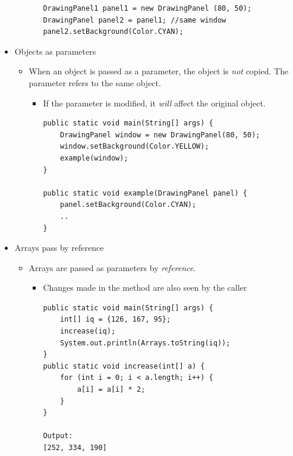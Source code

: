 \documentclass[a4paper]{article}
\begin{document}
\begin{itemize}
\begin{itemize}
\begin{itemize}
\begin{lstlisting}
DrawingPanel1 panel1 = new DrawingPanel (80, 50);
DrawingPanel panel2 = panel1; //same window
panel2.setBackground(Color.CYAN);
					\end{lstlisting}
			\end{itemize}
	\end{itemize}
	\item Objects as parameters
		\begin{itemize}
			\item When an object is passed as a parameter, the object is \textit{not} copied. The parameter refers to the same object.
				\begin{itemize}
					\item If the parameter is modified, it \textit{will} affect the original object.
					\begin{lstlisting}
public static void main(String[] args) {
	DrawingPanel window = new DrawingPanel(80, 50);
	window.setBackground(Color.YELLOW);
	example(window);
}

public static void example(DrawingPanel panel) {
	panel.setBackground(Color.CYAN);
	..
}
					\end{lstlisting}
				\end{itemize}
		\end{itemize}
	\item Arrays pass by reference
		\begin{itemize}
			\item Arrays are passed as parameters by \textit{reference}.
				\begin{itemize}
					\item Changes made in the method are also seen by the caller
						\begin{lstlisting}
public static void main(String[] args) {
	int[] iq = {126, 167, 95};
	increase(iq);
	System.out.println(Arrays.toString(iq));
}
public static void increase(int[] a) {
	for (int i = 0; i < a.length; i++) {
		a[i] = a[i] * 2;
	}
}

Output:
[252, 334, 190]
						\end{lstlisting}
						 

\end{itemize}
\end{itemize}
\end{itemize}
\end{document}
